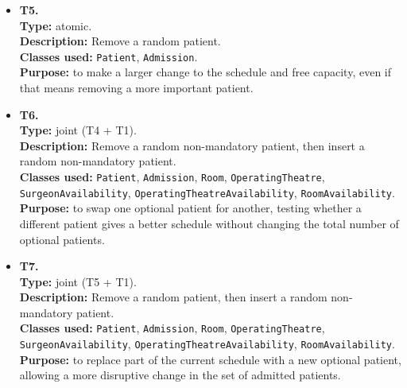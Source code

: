 \documentclass[10pt]{article}
\newcommand{\tlabel}[1]{{\large\bfseries #1}}
\begin{document}
\begin{itemize}
    \item \tlabel{T5.}\\
    \textbf{Type:} atomic.\\
    \textbf{Description:} Remove a random patient.\\
    \textbf{Classes used:} \texttt{Patient}, \texttt{Admission}.\\
    \textbf{Purpose:} to make a larger change to the schedule and free capacity, even if that means removing a more important patient.
    
    \item \tlabel{T6.}\\
    \textbf{Type:} joint (T4 + T1).\\
    \textbf{Description:} Remove a random non-mandatory patient, then insert a random non-mandatory patient.\\
    \textbf{Classes used:} \texttt{Patient}, \texttt{Admission}, \texttt{Room}, \texttt{OperatingTheatre}, \texttt{SurgeonAvailability}, \texttt{OperatingTheatreAvailability}, \texttt{RoomAvailability}.\\
    \textbf{Purpose:} to swap one optional patient for another, testing whether a different patient gives a better schedule without changing the total number of optional patients.
    
    \item \tlabel{T7.}\\
    \textbf{Type:} joint (T5 + T1).\\
    \textbf{Description:} Remove a random patient, then insert a random non-mandatory patient.\\
    \textbf{Classes used:} \texttt{Patient}, \texttt{Admission}, \texttt{Room}, \texttt{OperatingTheatre}, \texttt{SurgeonAvailability}, \texttt{OperatingTheatreAvailability}, \texttt{RoomAvailability}.\\
    \textbf{Purpose:} to replace part of the current schedule with a new optional patient, allowing a more disruptive change in the set of admitted patients.
\end{itemize}
\end{document}
